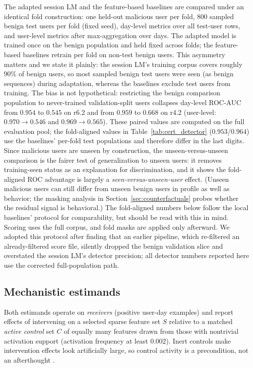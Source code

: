 \documentclass[10pt]{article} %
\newcommand{\rsix}{r6.2}
\newcommand{\rfour}{r4.2}
\begin{document}
The adapted session LM and the feature-based baselines are compared under an
identical fold construction:
one held-out malicious user per fold, $800$ sampled benign test users per fold
(fixed seed), day-level metrics over all test-user rows, and user-level metrics
after max-aggregation over days. The adapted model is trained once on the
benign population and held fixed across folds; the feature-based baselines
retrain per fold on non-test benign users. This asymmetry matters and we
state it plainly: the session LM's training corpus covers roughly $90\%$ of
benign users, so most sampled benign test users were seen (as benign
sequences) during adaptation, whereas the baselines exclude test users from
training. The bias is not hypothetical: restricting the benign comparison population
to never-trained validation-split users collapses day-level ROC-AUC from
$0.954$ to $0.545$ on \rsix{} and from $0.959$ to $0.668$ on \rfour{}
(user-level: $0.970\!\to\!0.546$ and $0.969\!\to\!0.565$). These paired
values are computed on the full evaluation pool; the fold-aligned values in
Table~\ref{tab:cert_detector} ($0.953$/$0.964$) use the baselines' per-fold
test populations and therefore differ in the last digits. Since malicious
users are unseen by construction, the unseen-versus-unseen comparison is the
fairer test of generalization to unseen users: it removes training-seen
status as an explanation for discrimination, and it shows the fold-aligned
ROC advantage is largely a \emph{seen-versus-unseen-user} effect. (Unseen
malicious users can still differ from unseen benign users in profile as well
as behavior; the masking analysis in Section~\ref{sec:counterfactuals} probes whether
the residual signal is behavioral.) The fold-aligned numbers below follow the local baselines' protocol
for comparability, but should be read with this in mind. Scoring uses the full corpus, and fold masks are
applied only afterward. We adopted this protocol after finding that an earlier
pipeline, which re-filtered an already-filtered score file, silently dropped
the benign validation slice and overstated the session LM's detector
precision; all
detector numbers reported here use the corrected full-population path.

\subsection{Mechanistic estimands}
\label{sec:mechprotocol}

Both estimands operate on \emph{receivers} (positive user-day examples) and
report effects of intervening on a selected sparse feature set $S$ relative to
a matched \emph{active control} set $C$ of equally many features drawn from
those with nontrivial activation support (activation frequency at least
$0.002$). Inert controls make intervention effects look artificially large, so
control activity is a precondition, not an afterthought \citep{zhang2023best}.
\end{document}
